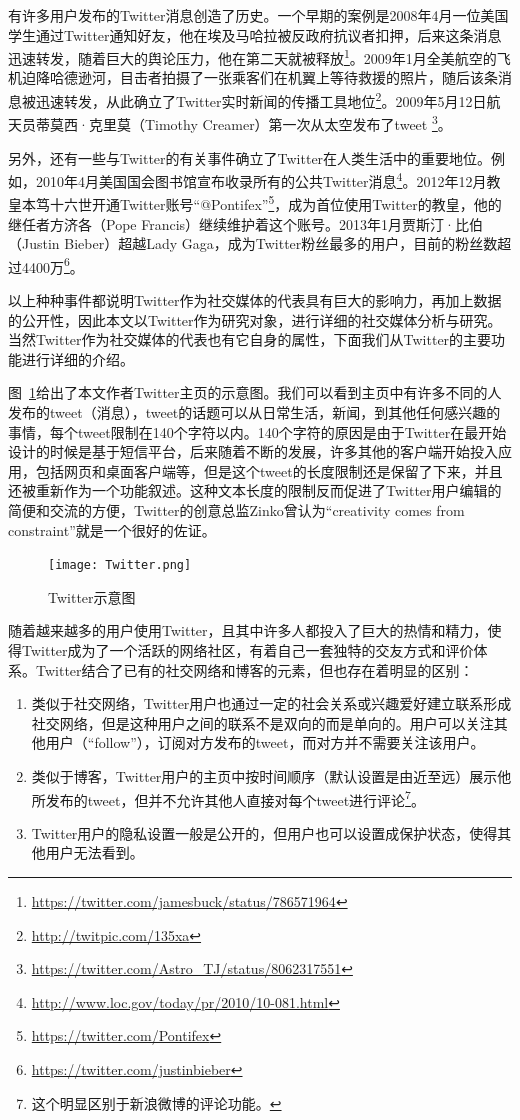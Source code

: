 有许多用户发布的Twitter消息创造了历史。一个早期的案例是2008年4月一位美国学生通过Twitter通知好友，他在埃及马哈拉被反政府抗议者扣押，后来这条消息迅速转发，随着巨大的舆论压力，他在第二天就被释放\footnote{\url{https://twitter.com/jamesbuck/status/786571964}}。2009年1月全美航空的飞机迫降哈德逊河，目击者拍摄了一张乘客们在机翼上等待救援的照片，随后该条消息被迅速转发，从此确立了Twitter实时新闻的传播工具地位\footnote{\url{http://twitpic.com/135xa}}。2009年5月12日航天员蒂莫西·克里莫（Timothy Creamer）第一次从太空发布了tweet \footnote{\url{https://twitter.com/Astro_TJ/status/8062317551}}。

另外，还有一些与Twitter的有关事件确立了Twitter在人类生活中的重要地位。例如，2010年4月美国国会图书馆宣布收录所有的公共Twitter消息\footnote{\url{http://www.loc.gov/today/pr/2010/10-081.html}}。2012年12月教皇本笃十六世开通Twitter账号“@Pontifex”\footnote{\url{https://twitter.com/Pontifex}}，成为首位使用Twitter的教皇，他的继任者方济各（Pope Francis）继续维护着这个账号。2013年1月贾斯汀·比伯（Justin Bieber）超越Lady Gaga，成为Twitter粉丝最多的用户，目前的粉丝数超过4400万\footnote{\url{https://twitter.com/justinbieber}}。

以上种种事件都说明Twitter作为社交媒体的代表具有巨大的影响力，再加上数据的公开性，因此本文以Twitter作为研究对象，进行详细的社交媒体分析与研究。当然Twitter作为社交媒体的代表也有它自身的属性，下面我们从Twitter的主要功能进行详细的介绍。

图~\ref{Twitter}给出了本文作者Twitter主页的示意图。我们可以看到主页中有许多不同的人发布的tweet（消息），tweet的话题可以从日常生活，新闻，到其他任何感兴趣的事情，每个tweet限制在140个字符以内。140个字符的原因是由于Twitter在最开始设计的时候是基于短信平台，后来随着不断的发展，许多其他的客户端开始投入应用，包括网页和桌面客户端等，但是这个tweet的长度限制还是保留了下来，并且还被重新作为一个功能叙述。这种文本长度的限制反而促进了Twitter用户编辑的简便和交流的方便，Twitter的创意总监Zinko曾认为“creativity comes from constraint”就是一个很好的佐证。

\begin{figure}[htp]
\centering
\texttt{[image: Twitter.png]}
\caption{Twitter示意图}
\label{Twitter}
\end{figure}

随着越来越多的用户使用Twitter，且其中许多人都投入了巨大的热情和精力，使得Twitter成为了一个活跃的网络社区，有着自己一套独特的交友方式和评价体系。Twitter结合了已有的社交网络和博客的元素，但也存在着明显的区别：
   \begin{enumerate}
    \item 类似于社交网络，Twitter用户也通过一定的社会关系或兴趣爱好建立联系形成社交网络，但是这种用户之间的联系不是双向的而是单向的。用户可以关注其他用户（“follow”），订阅对方发布的tweet，而对方并不需要关注该用户。
    \item 类似于博客，Twitter用户的主页中按时间顺序（默认设置是由近至远）展示他所发布的tweet，但并不允许其他人直接对每个tweet进行评论\footnote{这个明显区别于新浪微博的评论功能。}。
     \item Twitter用户的隐私设置一般是公开的，但用户也可以设置成保护状态，使得其他用户无法看到。
  \end{enumerate}  

